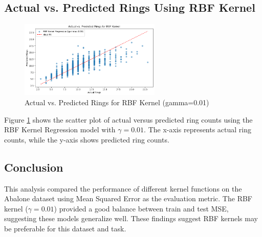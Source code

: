 \documentclass{article}
\begin{document}
	\subsection*{Actual vs. Predicted Rings Using RBF Kernel}
	\begin{figure}[h!]
		\centering
		\includegraphics[width=0.6\textwidth]{images/q6_ActualVsPredicted.png}
		\caption{Actual vs. Predicted Rings for RBF Kernel (gamma=0.01)}
		\label{fig:actual_vs_predicted_rbf}
	\end{figure}
	
	Figure \ref{fig:actual_vs_predicted_rbf} shows the scatter plot of actual versus predicted ring counts using the RBF Kernel Regression model with $\gamma=0.01$. The x-axis represents actual ring counts, while the y-axis shows predicted ring counts.
	
	\subsection*{Conclusion}
	This analysis compared the performance of different kernel functions on the Abalone dataset using Mean Squared Error as the evaluation metric. The RBF kernel ($\gamma = 0.01$) provided a good balance between train and test MSE, suggesting these models generalize well. These findings suggest RBF kernels may be preferable for this dataset and task.
\end{document}
